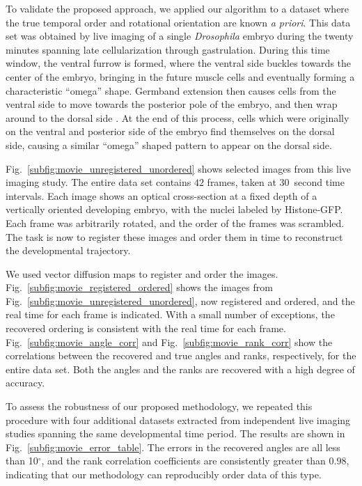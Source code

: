 \documentclass{pnastwo}
\newcommand{\fig}[0]{Fig.}
\begin{document}
\begin{article}
To validate the proposed approach, we applied our algorithm to a dataset where the true temporal order and rotational orientation are known {\em a priori}.
%
This data set was obtained by live imaging of a single {\it Drosophila} embryo during the twenty minutes spanning late cellularization through gastrulation.
%
During this time window, the ventral furrow is formed, where the ventral side buckles towards the center of the embryo, bringing in the future muscle cells and eventually forming a characteristic ``omega'' shape.
%
Germband extension then causes cells from the ventral side to move towards the posterior pole of the embryo, and then wrap around to the dorsal side \cite{leptin2005gastrulation}.
%
At the end of this process, cells which were originally on the ventral and posterior side of the embryo find themselves on the dorsal side, causing a similar ``omega'' shaped pattern to appear on the dorsal side.

\fig~\ref{subfig:movie_unregistered_unordered} shows selected images from this live imaging study. 
%
The entire data set contains $42$ frames, taken at $30$~second time intervals.
%
Each image shows an optical cross-section at a fixed depth of a vertically oriented developing embryo, with the nuclei labeled by Histone-GFP.
%
Each frame was arbitrarily rotated, and the order of the frames was scrambled.
%
The task is now to register these images and order them in time to reconstruct the developmental trajectory.

We used vector diffusion maps to register and order the images. 
%
\fig~\ref{subfig:movie_registered_ordered} shows the images from \fig~\ref{subfig:movie_unregistered_unordered}, now registered and ordered, and the real time for each frame is indicated.
%
With a small number of exceptions, the recovered ordering is consistent with the real time for each frame. 
%
\fig~\ref{subfig:movie_angle_corr} and \fig~\ref{subfig:movie_rank_corr}  show the correlations between the recovered and true angles and ranks, respectively, for the entire data set. 
%
Both the angles and the ranks are recovered with a high degree of accuracy.

To assess the robustness of our proposed methodology, we repeated this procedure with four additional datasets extracted from independent live imaging studies spanning the same developmental time period. 
%
The results are shown in \fig~\ref{subfig:movie_error_table}. 
%
The errors in the recovered angles are all less than 10$^\circ$, and the rank correlation coefficients are consistently greater than $0.98$, indicating that our methodology can reproducibly order data of this type.


\end{article}
\end{document}
